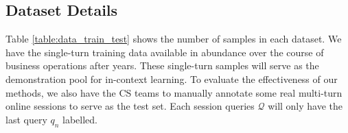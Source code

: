 \subsection{Dataset Details}
Table \ref{table:data_train_test} shows the number of samples in each dataset.  We have the single-turn training data available in abundance over the course of business operations after years. These single-turn samples will serve as the demonstration pool for in-context learning. To evaluate the effectiveness of our methods, we also have the CS teams to manually annotate some real multi-turn online sessions to serve as the test set. Each session queries $\mathcal{Q}$ will only have the last query $q_n$ labelled. 
\begin{table}[t]
\centering
{}
\caption{The major languages, number of intents, and the number of samples in each market for Single Turn (ST) and Multi-Turn (MT). }
\label{table:data_train_test}
\end{table}








